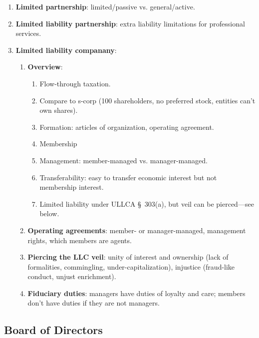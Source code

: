 \begin{enumerate}
    \item \textbf{Limited partnership}: limited/passive vs. general/active.
    \item \textbf{Limited liability partnership}: extra liability limitations 
    for professional services.
    \item \textbf{Limited liability companany}:
    \begin{enumerate}
        \item \textbf{Overview}:
        \begin{enumerate}
            \item Flow-through taxation.
            \item Compare to s-corp (100 shareholders, no preferred stock, 
            entities can't own shares).
            \item Formation: articles of organization, operating agreement.
            \item Membership
            \item Management: member-managed vs. manager-managed.
            \item Transferability: easy to transfer economic interest but not 
            membership interest.
            \item Limited liability under ULLCA \S\ 303(a), but veil can be 
            pierced---see below.
        \end{enumerate}
        \item \textbf{Operating agreements}: member- or manager-managed, 
        management rights, which members are agents.
        \item \textbf{Piercing the LLC veil}: unity of interest and ownership 
        (lack of formalities, commingling, under-capitalization), injustice 
        (fraud-like conduct, unjust enrichment).
        \item \textbf{Fiduciary duties}: managers have duties of loyalty and 
        care; members don't have duties if they are not managers.
    \end{enumerate}
\end{enumerate}

\newpage

\subsection{Board of Directors}

